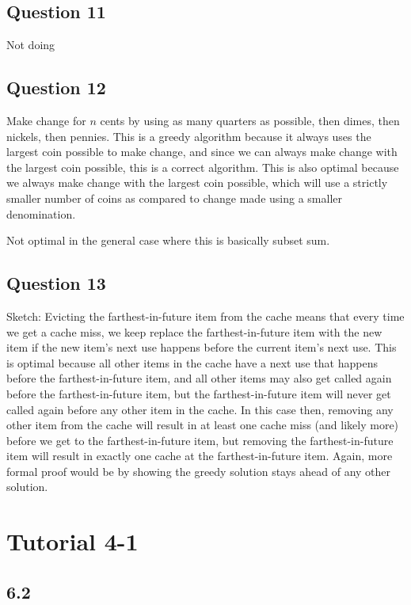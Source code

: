 \documentclass[11pt]{article}
\begin{document}
\subsection{Question 11}

Not doing

\subsection{Question 12}

Make change for $n$ cents by using as many quarters as possible, then dimes, then nickels, then pennies. This is a greedy algorithm because it always uses the largest coin possible to make change, and since we can always make change with the largest coin possible, this is a correct algorithm. This is also optimal because we always make change with the largest coin possible, which will use a strictly smaller number of coins as compared to change made using a smaller denomination.

Not optimal in the general case where this is basically subset sum.

\subsection{Question 13}

Sketch: Evicting the farthest-in-future item from the cache means that every time we get a cache miss, we keep replace the farthest-in-future item with the new item if the new item's next use happens before the current item's next use. This is optimal because all other items in the cache have a next use that happens before the farthest-in-future item, and all other items may also get called again before the farthest-in-future item, but the farthest-in-future item will never get called again before any other item in the cache. In this case then, removing any other item from the cache will result in at least one cache miss (and likely more) before we get to the farthest-in-future item, but removing the farthest-in-future item will result in exactly one cache at the farthest-in-future item. Again, more formal proof would be by showing the greedy solution stays ahead of any other solution.

\section{Tutorial 4-1}

\subsection{6.2}
\end{document}
